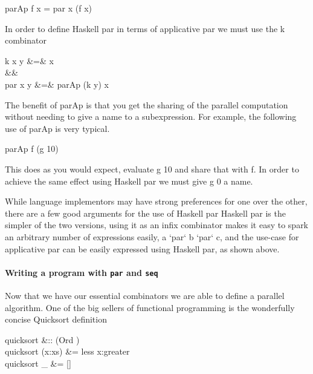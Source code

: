 \begin{haskell}
parAp f x = par x (f x)
\end{haskell}

In order to define Haskell par in terms of applicative par we must use the
\<k\> combinator

\begin{haskell}
k x y &=& x \\
\quad&&\quad \\
par x y &=& parAp (k y) x
\end{haskell}

The benefit of \<parAp\> is that you get the sharing of the parallel computation
without needing to give a name to a subexpression. For example, the following use of
\<parAp\> is very typical.

\begin{haskell}
parAp f (g 10)
\end{haskell}

This does as you would expect, evaluate \<g 10\> and share that with
\<f\>. In order to achieve the same effect using Haskell \<par\> we must
give \<g 0\> a name.

\begin{haskell}
\end{haskell}


While language implementors may have strong preferences for one over the other,
there are a few good arguments for the use of Haskell \<par\> Haskell
\<par\> is the simpler of the two versions, using it as an infix combinator
makes it easy to spark an arbitrary number of expressions easily,
\<a `par` b `par` c\>, and the use-case for applicative \<par\> can be easily
expressed using Haskell \<par\>, as shown above.

\paragraph{Writing a program with \texttt{par} and \texttt{seq}}

Now that we have our essential combinators we are able to define a parallel
algorithm. One of the big sellers of functional programming is the wonderfully
concise Quicksort definition

\begin{haskell}
quicksort &:: (Ord \hasalpha) \Rightarrow [\hasalpha] \to [\hasalpha]\\
quicksort (x:xs) &= less \hsapp x:greater
             \\
quicksort \_ &= []
\end{haskell}

